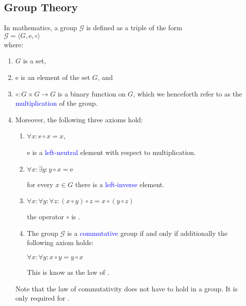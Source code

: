 \subsection{Group Theory}
In mathematics, a group $\mathcal{G}$  is defined as a triple of the form
\\[0.2cm]
\hspace*{1.3cm}
$\mathcal{G} = \langle G, \mathrm{e}, \circ \rangle$
\\[0.2cm]
where:
\begin{enumerate}
\item $G$ is a set,
\item $\mathrm{e}$ is an element of the set $G$, and
\item $\circ: G \times G \rightarrow G$ is a binary function on $G$, which we henceforth refer to as the
      \textcolor{blue}{multiplication} of the group.
\item Moreover, the following three axioms hold:
      \begin{enumerate}
      \item $\forall x: \mathrm{e} \circ x = x$,
        
            $\mathrm{e}$ is a \textcolor{blue}{left-neutral} element with respect to multiplication.
      \item $\forall x: \exists{y}: y \circ x = \mathrm{e}$

            for every $x \in G$ there is a \textcolor{blue}{left-inverse} element.
      \item $\forall x: \forall y: \forall z: (x \circ y) \circ z = x \circ (y \circ z)$

            the operator $\circ$ is .

      \item The group $\mathcal{G}$ is a \textcolor{blue}{commutative} group if and only if additionally the
            following axiom holds: 
        
            $\forall x: \forall y: x \circ y = y \circ x$

            This is know as the law of .
            \eox
      \end{enumerate}
      Note that the law of commutativity does not have to hold in a group.  It is only required for
      . 
\end{enumerate}

